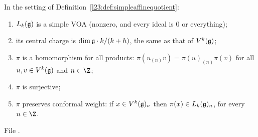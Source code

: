 \begin{theorem}\label{l23:thm:simpleaffinequotient}
In the setting of Definition~\ref{l23:def:simpleaffinequotient}:
\begin{enumerate}
\item $L_k(\mathfrak g)$ is a simple VOA (nonzero, and every ideal is $0$ or everything);
\item its central charge is $\dim\mathfrak g\cdot k/(k+h)$, the same as that of $V^k(\mathfrak g)$;
\item $\pi$ is a homomorphism for all products: $\pi(u_{(n)}v)=\pi(u)_{(n)}\pi(v)$ for all $u,v\in V^k(\mathfrak g)$ and $n\in\Z$;
\item $\pi$ is surjective;
\item $\pi$ preserves conformal weight: if $x\in V^k(\mathfrak g)_n$ then $\pi(x)\in L_k(\mathfrak g)_n$, for every $n\in\Z$.
\end{enumerate}
\end{theorem}
\noindent File .
